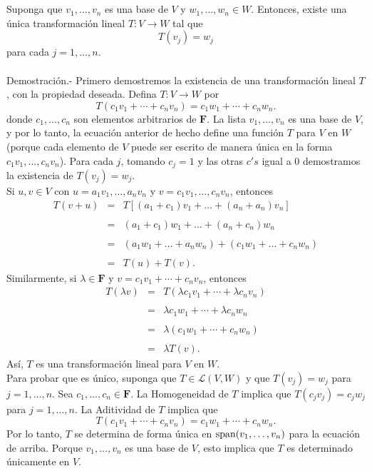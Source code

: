 \setcounter{myteo}{4}
\begin{myteo}\,\\\\
    Suponga que $v_1,\ldots,v_n$ es una base de $V$ y $w_1,\ldots,w_n\in W$. Entonces, existe una única transformación lineal $T:V\to W$ tal que 
    $$T(v_j)=w_j$$
    para cada $j=1,\ldots,n$.\\\\
	Demostración.-\; Primero demostremos la existencia de una transformación lineal $T$, con la propiedad deseada. Defina $T:V\to W$ por
	$$T(c_1v_1+\cdots+c_nv_n)=c_1w_1+\cdots+c_nw_n.$$
	donde $c_1,\ldots,c_n$ son elementos arbitrarios de $\textbf{F}$. La lista $v_1,\ldots,v_n$ es una base de $V$, y por lo tanto, la ecuación anterior de hecho define una función $T$ para $V$ en $W$ (porque cada elemento de $V$ puede ser escrito de manera única en la forma $c_1v_1,\ldots,c_nv_n$). Para cada $j$, tomando $c_j=1$ y las otras $c's$ igual a $0$ demostramos la existencia de $T(v_j)=w_j$.\\
	Si $u,v\in V$ con $u=a_1v_1,\ldots,a_nv_n$ y $v=c_1v_1,\ldots,c_nv_n$, entonces
	$$
	\begin{array}{rcl}
	    T(v+u) &=& T\left[(a_1+c_1)v_1+\ldots+(a_n+a_n)v_n\right]\\\\
		   &=& (a_1+c_1)w_1+\ldots+(a_n+c_n)w_n\\\\
		   &=& (a_1w_1+\ldots+a_nw_n)+(c_1w_1+\ldots+c_nw_n)\\\\
		   &=& T(u)+T(v).
	\end{array}
	$$
	Similarmente, si $\lambda \in \textbf{F}$ y $v=c_1v_1+\cdots+c_nv_n$, entonces
	$$
	\begin{array}{rcl}
	    T(\lambda v) &=& T(\lambda c_1v_1+\cdots+\lambda c_nv_n)\\\\
			 &=&\lambda c_1w_1+\cdots+\lambda c_nw_n\\\\
			 &=&\lambda(c_1w_1+\cdots+c_nw_n)\\\\
			 &=&\lambda T(v).
	\end{array}
	$$
	Así, $T$ es una transformación lineal para $V$ en $W$.\\
	Para probar que es único, suponga que $T\in \mathcal{L}(V,W)$ y que $T(v_j)=w_j$ para $j=1,\ldots,n$. Sea $c_1,\ldots,c_n\in \textbf{F}$. La Homogeneidad de $T$ implica que $T(c_jv_j)=c_jw_j$ para $j=1,\ldots,n$. La Aditividad de $T$ implica que 
	$$T(c_1v_1+\cdots+c_nv_n)=c_1w_1+\cdots+c_nw_n.$$
	Por lo tanto, $T$ se determina de forma única en $\mathop{\mbox{\normalfont span}}\nolimits(v_1,\ldots,v_n)$ para la ecuación de arriba. Porque $v_1,\ldots,v_n$ es una base de $V$, esto implica que $T$ es determinado únicamente en $V$.
\end{myteo}

